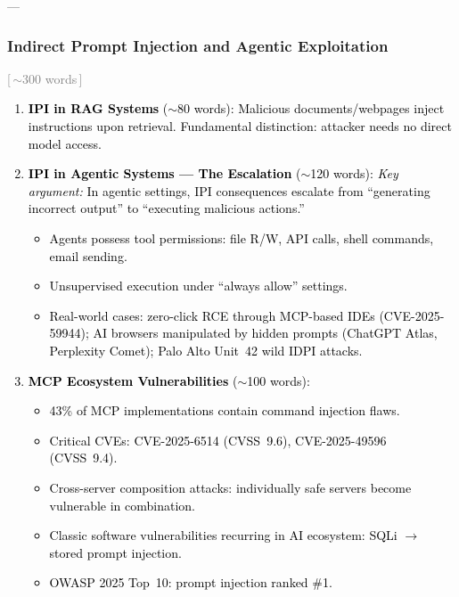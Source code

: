 ––\documentclass[preprint,12pt]{elsarticle}
\newcommand{\wordcount}[1]{\hfill\textcolor{gray}{\small[\,#1\,]}}
\newcommand{\outline}[1]{\textcolor{black}{#1}}
\begin{document}
\subsubsection{Indirect Prompt Injection and Agentic Exploitation} \wordcount{$\sim$300 words}

\outline{%
\begin{enumerate}[nosep,leftmargin=1.5em,label=(\alph*)]
    \item \textbf{IPI in RAG Systems} ($\sim$80 words): Malicious documents/webpages inject instructions upon retrieval. Fundamental distinction: attacker needs no direct model access.
    
    \item \textbf{IPI in Agentic Systems --- The Escalation} ($\sim$120 words): 
    \emph{Key argument:} In agentic settings, IPI consequences escalate from ``generating incorrect output'' to ``executing malicious actions.''
    \begin{itemize}[nosep,leftmargin=1em]
        \item Agents possess tool permissions: file R/W, API calls, shell commands, email sending.
        \item Unsupervised execution under ``always allow'' settings.
        \item Real-world cases: zero-click RCE through MCP-based IDEs (CVE-2025-59944); AI browsers manipulated by hidden prompts (ChatGPT Atlas, Perplexity Comet); Palo Alto Unit~42 wild IDPI attacks.
    \end{itemize}
    
    \item \textbf{MCP Ecosystem Vulnerabilities} ($\sim$100 words):
    \begin{itemize}[nosep,leftmargin=1em]
        \item 43\% of MCP implementations contain command injection flaws.
        \item Critical CVEs: CVE-2025-6514 (CVSS~9.6), CVE-2025-49596 (CVSS~9.4).
        \item Cross-server composition attacks: individually safe servers become vulnerable in combination.
        \item Classic software vulnerabilities recurring in AI ecosystem: SQLi $\to$ stored prompt injection.
        \item OWASP 2025 Top~10: prompt injection ranked \#1.
    \end{itemize}
\end{enumerate}
}
\end{document}
